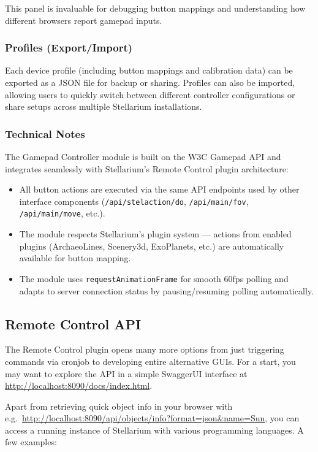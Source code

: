 This panel is invaluable for debugging button mappings and understanding how
different browsers report gamepad inputs.

\subsubsection{Profiles (Export/Import)}

Each device profile (including button mappings and calibration data) can be
exported as a JSON file for backup or sharing. Profiles can also be imported,
allowing users to quickly switch between different controller configurations
or share setups across multiple Stellarium installations.

\subsubsection{Technical Notes}

The Gamepad Controller module is built on the W3C Gamepad API and integrates
seamlessly with Stellarium's Remote Control plugin architecture:

\begin{itemize}
\item All button actions are executed via the same API endpoints used by other
  interface components (\texttt{/api/stelaction/do}, \texttt{/api/main/fov},
  \texttt{/api/main/move}, etc.).
\item The module respects Stellarium's plugin system --- actions from enabled
  plugins (ArchaeoLines, Scenery3d, ExoPlanets, etc.) are automatically
  available for button mapping.
\item The module uses \texttt{requestAnimationFrame} for smooth 60fps polling
  and adapts to server connection status by pausing/resuming polling
  automatically.
\end{itemize}

\subsection{Remote Control API}
\label{sec:plugins:RemoteControl:API}

The Remote Control plugin opens many more options from just triggering commands via cronjob to developing entire alternative GUIs. 
For a start, you may want to explore the API in a simple SwaggerUI interface at \url{http://localhost:8090/docs/index.html}. 

Apart from retrieving quick object info in your browser with e.g.\ \url{http://localhost:8090/api/objects/info?format=json&name=Sun},
you can access a running instance of Stellarium with various programming languages. A few examples:

